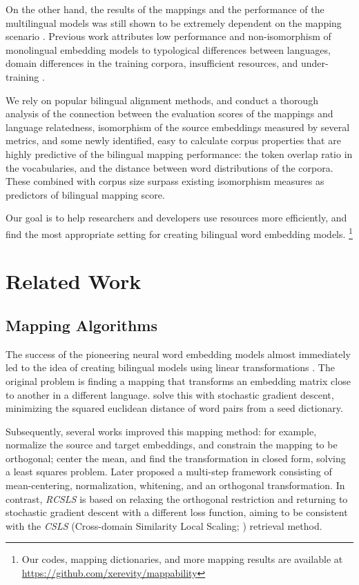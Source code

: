 \documentclass[11pt]{article}
\begin{document}
On the other hand, the results of the mappings and the performance of the multilingual models was still shown to be extremely dependent on the mapping scenario \cite{sogaard-etal-2018-limitations, vulic-etal-2019-really, vulic-etal-2020-good}. 
Previous work attributes low performance and non-isomorphism of monolingual embedding models to typological differences between languages, domain differences in the training corpora, insufficient resources, and under-training \cite{doval-etal-2020-robustness, sogaard-etal-2018-limitations, vulic-etal-2020-good}. 

We rely on popular bilingual alignment methods, and conduct a thorough analysis of the connection between the evaluation scores of the mappings and language relatedness, isomorphism of the source embeddings measured by several metrics, and some newly identified, easy to calculate corpus properties that
are highly predictive of the bilingual mapping performance:
the token overlap ratio in the vocabularies, and the distance between word distributions of the corpora. These combined with corpus size surpass existing isomorphism measures as predictors of bilingual mapping score.

Our goal is to help researchers and developers use resources more efficiently, and find the most appropriate setting for creating bilingual word embedding models. \footnote{Our codes, mapping dictionaries, and more mapping results are available at \href{https://github.com/xerevity/mappability}{https://github.com/xerevity/mappability} }

\section{Related Work}
\subsection{Mapping Algorithms}
	The success of the pioneering neural word embedding models \cite{mikolov-distributed} almost immediately led to the idea of creating bilingual models using linear transformations \cite{mikolov-exploiting}. The original problem is finding a mapping that transforms an embedding matrix close to another in a different language.  solve this with stochastic gradient descent, minimizing the squared euclidean distance of word pairs from a seed dictionary. 

	Subsequently, several works improved this mapping method: for example,  normalize the source and target embeddings, and constrain the mapping to be orthogonal;  center the mean, and find the transformation in closed form, solving a least squares problem. Later  proposed a multi-step framework consisting of mean-centering, normalization, whitening, and an orthogonal transformation. In contrast, \textit{RCSLS} \cite{joulin-etal-2018-loss} is based on relaxing the orthogonal restriction and returning to stochastic gradient descent with a different loss function, aiming to be consistent with the \textit{CSLS} (Cross-domain Similarity Local Scaling; \citealp{Conneau2018WordTW}) retrieval method. 
	
\end{document}
